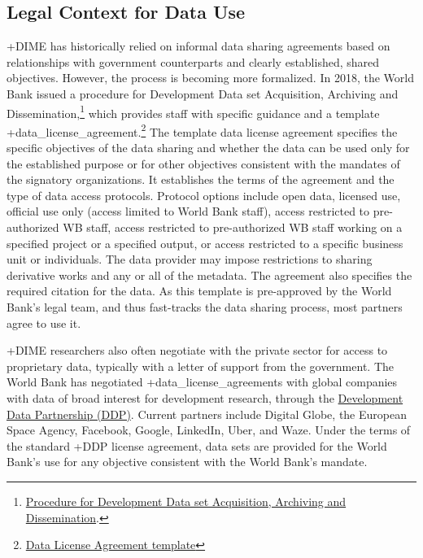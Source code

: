 \documentclass[
]{book}
\begin{document}
\hypertarget{legal-context-for-data-use-7}{%
\subsection{Legal Context for Data Use}\label{legal-context-for-data-use-7}}

+DIME\textbar{} has historically relied on informal data sharing agreements based on relationships with government counterparts and clearly established, shared objectives. However, the process is becoming more formalized. In 2018, the World Bank issued a procedure for Development Data set Acquisition, Archiving and Dissemination,\footnote{\href{https://policies.worldbank.org/sites/ppf3/PPFDocuments/17edbe3e480a4ee491d7c6a4e2ae9f32.pdf}{Procedure for Development Data set Acquisition, Archiving and Dissemination}.} which provides staff with specific guidance and a template +data\_license\_agreement\textbar.\footnote{\href{https://worldbankgroup.sharepoint.com/teams/ddh/SiteAssets/SitePages/ddh/DataLicenseAgreementTemplate_v4.pdf}{Data License Agreement template}} The template data license agreement specifies the specific objectives of the data sharing and whether the data can be used only for the established purpose or for other objectives consistent with the mandates of the signatory organizations. It establishes the terms of the agreement and the type of data access protocols. Protocol options include open data, licensed use, official use only (access limited to World Bank staff), access restricted to pre-authorized WB staff, access restricted to pre-authorized WB staff working on a specified project or a specified output, or access restricted to a specific business unit or individuals. The data provider may impose restrictions to sharing derivative works and any or all of the metadata. The agreement also specifies the required citation for the data. As this template is pre-approved by the World Bank's legal team, and thus fast-tracks the data sharing process, most partners agree to use it.

+DIME\textbar{} researchers also often negotiate with the private sector for access to proprietary data, typically with a letter of support from the government. The World Bank has negotiated +data\_license\_agreements\textbar{} with global companies with data of broad interest for development research, through the \href{https://datapartnership.org/}{Development Data Partnership (DDP)}. Current partners include Digital Globe, the European Space Agency, Facebook, Google, LinkedIn, Uber, and Waze. Under the terms of the standard +DDP\textbar{} license agreement, data sets are provided for the World Bank's use for any objective consistent with the World Bank's mandate.
\end{document}
